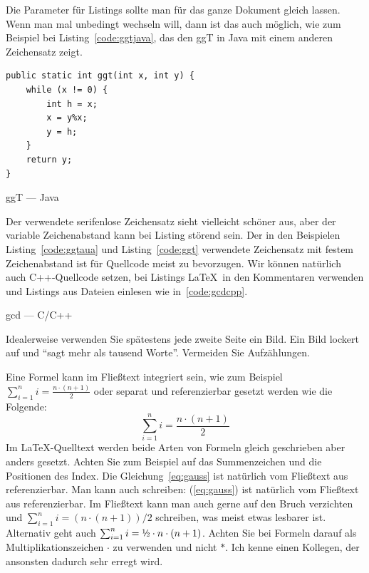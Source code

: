 \documentclass[11pt,a4paper]{report}
\begin{document}
Die Parameter für Listings sollte man für das ganze Dokument gleich 
lassen. 
Wenn man mal unbedingt wechseln will, dann ist das auch möglich,
wie zum Beispiel bei Listing~\ref{code:ggtjava}, das den ggT
in Java mit einem anderen Zeichensatz zeigt.

\begin{listing}[htbp]
\lstset{basicstyle=\sffamily, columns=[l]flexible, mathescape=true, showstringspaces=true, numbers=none, language=java}
\begin{lstlisting}
public static int ggt(int x, int y) {
    while (x != 0) {
        int h = x;
        x = y%x;
        y = h;
    }
    return y;
}
\end{lstlisting}
\caption{ggT --- Java}
\label{code:ggtjava}
\end{listing}

Der verwendete serifenlose Zeichensatz sieht vielleicht schöner 
aus, aber der variable Zeichenabstand kann bei Listing störend 
sein. Der in den Beispielen Listing~\ref{code:ggtaua} und 
Listing~\ref{code:ggt} verwendete Zeichensatz mit festem
Zeichenabstand ist für Quellcode meist zu bevorzugen.
Wir können natürlich auch C++-Quellcode setzen, bei Listings
\LaTeX\ in den Kommentaren verwenden und Listings aus
Dateien einlesen wie in~\ref{code:gcdcpp}.

\begin{listing}[htbp]
  \lstset{basicstyle=\ttfamily, columns=[l]flexible, mathescape=true, numbers=left, language=c++}
  
\caption{gcd --- C/C++}
\label{code:gcdcpp}
\end{listing}


Idealerweise verwenden Sie spätestens jede zweite Seite ein Bild. 
Ein Bild lockert auf und "`sagt mehr als tausend Worte"'.
Vermeiden Sie Aufzählungen.



Eine Formel kann im Fließtext integriert sein, wie zum Beispiel 
$\sum_{i=1}^n i = \frac{n \cdot (n+1)}{2}$ oder separat
und referenzierbar gesetzt werden wie die Folgende:
\begin{equation} \label{eq:gauss}
  \sum_{i=1}^n i = \frac{n \cdot (n+1)}{2}
\end{equation}
Im \LaTeX-Quelltext werden beide Arten von Formeln gleich geschrieben 
aber anders gesetzt. 
Achten Sie zum Beispiel auf das Summenzeichen und die Positionen 
des Index. 
Die Gleichung~\ref{eq:gauss} ist natürlich vom Fließtext aus referenzierbar.
Man kann auch schreiben: 
(\ref{eq:gauss}) ist natürlich vom Fließtext aus referenzierbar.
Im Fließtext kann man auch gerne auf den Bruch verzichten und 
$\sum_{i=1}^n i = (n \cdot (n+1))/2$
schreiben, was meist etwas lesbarer ist.
Alternativ geht auch 
$\sum_{i=1}^n i = \mbox{\textonehalf} \cdot n \cdot (n+1)$.
Achten Sie bei Formeln darauf als Multiplikationszeichen 
$\cdot$ zu verwenden und nicht $*$. 
Ich kenne einen Kollegen, der ansonsten dadurch sehr erregt wird. 
\end{document}
